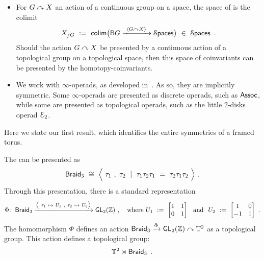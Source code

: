 \begin{conventions*}
{\begin{itemize}
\item
For $G\curvearrowright X$ an action of a continuous group on a space, the space of  is the colimit
\[
X_{/G}
~:=~
\operatorname{{\sf colim}}\bigl(
\mathsf B G
\xrightarrow{~\langle G \curvearrowright X \rangle~}
\operatorname{\mathcal S\mathsf{paces}}
\bigr)
~\in~
\operatorname{\mathcal S\mathsf{paces}}
~.
\]
Should the action $G\curvearrowright X$ be presented by a continuous action of a topological group on a topological space, then this space of coinvariants can be presented by the homotopy-coinvariants.  




\item
We work with $\infty$-operads, as developed in~\cite{HA}.
As so, they are implicitly symmetric.
Some $\infty$-operads are presented as discrete operads, such as ${\sf Assoc}$, while some are presented as topological operads, such as the little 2-disks operad $\mathcal E_2$.




\end{itemize}

}



\end{conventions*}






Here we state our first result, which identifies the entire symmetries of a framed torus.  



The  can be presented as
\begin{equation}
\label{e67}
\operatorname{{\sf Braid}_3} 
~\cong~
\Bigl \langle~ \tau_{1}~,~ \tau_{2}~ \mid ~ \tau_{1}\tau_{2}\tau_{1} ~=~ \tau_{2} \tau_{1} \tau_{2} ~\Bigr\rangle
~.
\end{equation}
Through this presentation, there is a standard representation
\begin{equation}
\label{e63}
\Phi
\colon
\operatorname{{\sf Braid}_3}
\xrightarrow{\bigl\langle~\tau_{1} ~\mapsto ~U_1~,~\tau_{2} ~ \mapsto ~U_2  \bigr\rangle}
\operatorname{\sf GL}_2(\mathbb Z)
~,
\hspace{7pt}
\text{ where }
U_1
~:=~
\begin{bmatrix} 
1 & 1
\\
0 & 1
\end{bmatrix}
\hspace{7pt}
\text{and}
\hspace{7pt}
U_2~:=~
\begin{bmatrix} 
1 & 0
\\
-1 & 1
\end{bmatrix}
~.
\end{equation} 
The homomorphism $\Phi$ defines an action $\operatorname{{\sf Braid}_3} \xrightarrow{\Phi} \operatorname{\sf GL}_2(\mathbb Z) \curvearrowright \mathbb T^2$
as a topological group.  
This action defines a topological group:
\[
\mathbb T^2 \rtimes \operatorname{{\sf Braid}_3} 
~.
\]



